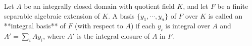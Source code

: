 Let $A$ be an integrally closed domain with quotient field $K$, and let $F$ be a finite separable algebraic extension of $K$. A basis $\{y_1, \cdots, y_n\}$ of $F$ over $K$ is called an **integral basis** of $F$ (with respect to $A$) if each $y_i$ is integral over $A$ and $A' = \sum_i A y_i$, where $A'$ is the integral closure of $A$ in $F$.
